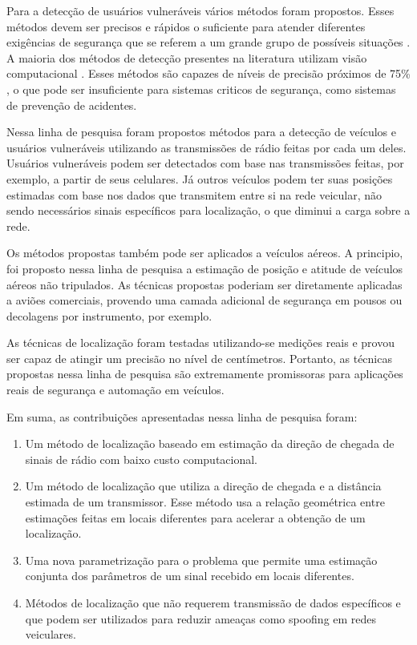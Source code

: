 \documentclass[12pt]{article}
\begin{document}
Para a detecção de usuários vulneráveis vários métodos foram propostos. Esses métodos devem ser precisos e rápidos o suficiente para atender diferentes exigências de segurança que se referem a um grande grupo de possíveis situações \cite{habibovic2011requirements}. A maioria dos métodos de detecção presentes na literatura utilizam visão computacional \cite{gavrila2004vision}. Esses métodos são capazes de níveis de precisão próximos de 75\% \cite{dollar2012pedestrian,geronimo2010survey}, o que pode ser insuficiente para sistemas criticos de segurança, como sistemas de prevenção de acidentes.

Nessa linha de pesquisa foram propostos métodos para a detecção de veículos e usuários vulneráveis utilizando as transmissões de rádio feitas por cada um deles. Usuários vulneráveis podem ser detectados com base nas transmissões feitas, por exemplo, a partir de seus celulares. Já outros veículos podem ter suas posições estimadas com base nos dados que transmitem entre si na rede veicular, não sendo necessários sinais específicos para localização, o que diminui a carga sobre a rede.

Os métodos propostas também pode ser aplicados a veículos aéreos. A principio, foi proposto nessa linha de pesquisa a estimação de posição e atitude de veículos aéreos não tripulados. As técnicas propostas poderiam ser diretamente aplicadas a aviões comerciais, provendo uma camada adicional de segurança em pousos ou decolagens por instrumento, por exemplo.

As técnicas de localização foram testadas utilizando-se medições reais e provou ser capaz de atingir um precisão no nível de centímetros. Portanto, as técnicas propostas nessa linha de pesquisa são extremamente promissoras para aplicações reais de segurança e automação em veículos.

Em suma, as contribuições apresentadas nessa linha de pesquisa foram:
\begin{enumerate}
\item Um método de localização baseado em estimação da direção de chegada de sinais de rádio com baixo custo computacional.
\item Um método de localização que utiliza a direção de chegada e a distância estimada de um transmissor. Esse método usa a relação geométrica entre estimações feitas em locais diferentes para acelerar a obtenção de um localização. 
\item Uma nova parametrização para o problema que permite uma estimação conjunta dos parâmetros de um sinal recebido em locais diferentes.
\item Métodos de localização que não requerem transmissão de dados específicos e que podem ser utilizados para reduzir ameaças como spoofing em redes veiculares. 
\end{enumerate}
\end{document}
